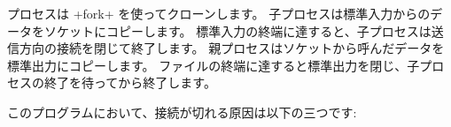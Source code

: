 プロセスは \ml+fork+ を使ってクローンします。
子プロセスは標準入力からのデータをソケットにコピーします。
標準入力の終端に達すると、子プロセスは送信方向の接続を閉じて終了します。
親プロセスはソケットから呼んだデータを標準出力にコピーします。
ファイルの終端に達すると標準出力を閉じ、子プロセスの終了を待ってから終了します。

このプログラムにおいて、接続が切れる原因は以下の三つです:
